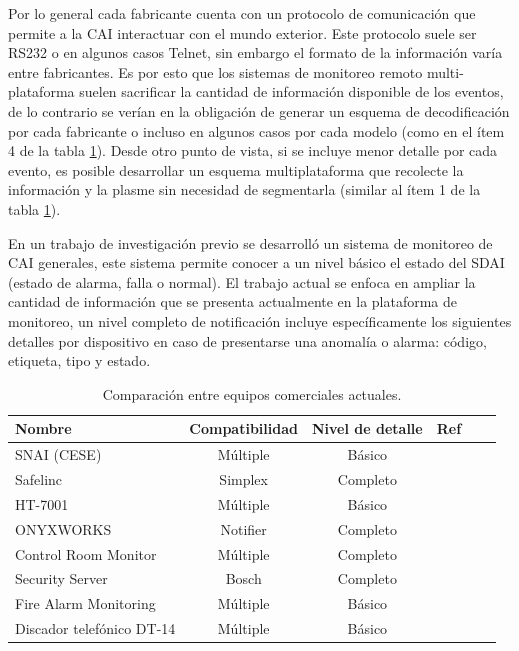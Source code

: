 Por lo general cada fabricante cuenta con un protocolo de comunicación que permite a la CAI interactuar con el mundo exterior. Este protocolo suele ser RS232 o en algunos casos Telnet, sin embargo el formato de la información varía entre fabricantes. Es por esto que los sistemas de monitoreo remoto multi-plataforma suelen sacrificar la cantidad de información disponible de los eventos, de lo contrario se verían en la obligación de generar un esquema de decodificación por cada fabricante o incluso en algunos casos por cada modelo (como en el ítem 4 de la tabla \ref{tab:comp}). Desde otro punto de vista, si se incluye menor detalle por cada evento, es posible desarrollar un esquema multiplataforma que recolecte la información y la plasme sin necesidad de segmentarla (similar al ítem 1 de la tabla \ref{tab:comp}).

En un trabajo de investigación previo se desarrolló un sistema de monitoreo de CAI generales, este sistema permite conocer a un nivel básico el estado del SDAI (estado de alarma, falla o normal). El trabajo actual se enfoca en ampliar la cantidad de información que se presenta actualmente en la plataforma de monitoreo, un nivel completo de notificación incluye específicamente los siguientes detalles por dispositivo en caso de presentarse una anomalía o alarma: código, etiqueta, tipo y estado.



\begin{table}[h]
\centering
\caption[caption corto]{Comparación entre equipos comerciales actuales.}
\begin{tabular}{l c c c c c}
\toprule
\textbf{Nombre} & \textbf{Compatibilidad}& \textbf{Nivel de detalle}& \textbf{Ref}\\
\midrule
SNAI (CESE) & Múltiple & Básico & \citep{cese} \\
Safelinc & Simplex & Completo & \citep{safelinc} \\
HT-7001 & Múltiple & Básico & \citep{ht7001}\\
ONYXWORKS & Notifier & Completo & \citep{onyxworks}\\
Control Room Monitor & Múltiple & Completo & \citep{nimbus} \\
Security Server & Bosch & Completo & \citep{ss_bosch} \\
Fire Alarm Monitoring & Múltiple & Básico & \citep{churches}\\
Discador telefónico DT-14 & Múltiple & Básico & \citep{dt_14}\\
\bottomrule
\hline
\end{tabular}
\label{tab:comp}
\end{table}

